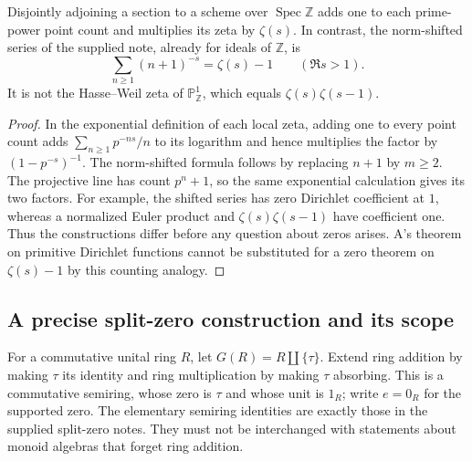 \begin{proposition}
\label{AC-G07}
Disjointly adjoining a section to a scheme over $\operatorname{Spec}\mathbb Z$
adds one to each prime-power point count and multiplies its zeta by
$\zeta(s)$.  In contrast, the norm-shifted series of the supplied note,
already for ideals of $\mathbb Z$, is
\[
 \sum_{n\geq1}(n+1)^{-s}=\zeta(s)-1\qquad(\Re s>1).
\]
It is not the Hasse--Weil zeta of $\mathbb P^1_{\mathbb Z}$,
which equals $\zeta(s)\zeta(s-1)$.
\end{proposition}
\begin{proof}
In the exponential definition of each local zeta, adding one to every
point count adds $\sum_{n\geq1}p^{-ns}/n$ to its logarithm and hence
multiplies the factor by $(1-p^{-s})^{-1}$.
The norm-shifted formula follows by replacing $n+1$ by $m\geq2$.
The projective line has count $p^n+1$, so the same exponential calculation
gives its two factors.  For example, the shifted series has zero
Dirichlet coefficient at $1$, whereas a normalized Euler product and
$\zeta(s)\zeta(s-1)$ have coefficient one.  Thus the constructions differ
before any question about zeros arises.  A's theorem on primitive
Dirichlet functions cannot be substituted for a zero theorem on
$\zeta(s)-1$ by this counting analogy.
\end{proof}

\subsection{A precise split-zero construction and its scope}

For a commutative unital ring $R$, let $G(R)=R\amalg\{\tau\}$.
Extend ring addition by making $\tau$ its identity and ring multiplication
by making $\tau$ absorbing.  This is a commutative semiring, whose zero
is $\tau$ and whose unit is $1_R$; write $e=0_R$ for the supported zero.
The elementary semiring identities are exactly those in the supplied
split-zero notes.  They must not be interchanged with statements about
monoid algebras that forget ring addition.

